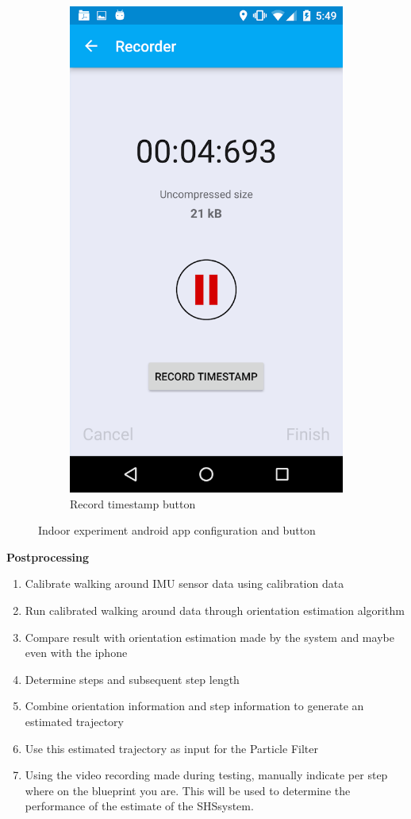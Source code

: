 \begin{figure}[H]
\begin{subfigure}[t]{.45\textwidth}
		\includegraphics[width=0.7\linewidth]{images/recording_timestamp_button}
		\caption{Record timestamp button}
		\label{fig:recording_timestamp_button}
	\end{subfigure}
\caption{Indoor experiment android app configuration and button}
\end{figure}


\textbf{Postprocessing}

\begin{enumerate}
	\def\labelenumi{\arabic{enumi}.}
	\tightlist
	\item
	Calibrate walking around \ac{IMU} sensor data using calibration data
	\item
	Run calibrated walking around data through orientation estimation
	algorithm
	\item
	Compare result with orientation estimation made by the system and
	maybe even with the iphone 
	\item
	Determine steps and subsequent step length 
	\item
	Combine orientation information and step information to generate an
	estimated trajectory
	\item
	Use this estimated trajectory as input for the Particle Filter
	\item
	Using the video recording made during testing, manually indicate per
	step where on the blueprint you are. This will be used to determine
	the performance of the estimate of the \ac{SHS}system. 
\end{enumerate}



